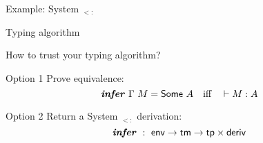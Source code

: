 \begin{frame}{\textcolor{greenish}{Example:} System $_{<:}$}
  \begin{block}{Typing algorithm}
    \begin{overlayarea}\textwidth{8em}
      \large {}




\end{overlayarea}
  \end{block}
\end{frame}

\begin{frame}{How to trust your typing algorithm?}
  \begin{block}{Option 1}
    Prove equivalence:
    $$
    {\text{\textit{\textbf{infer}}}}\ {\Gamma}\ {M}={\text{\textsf{Some}}}\  A
    \quad\text{iff}\quad
    \vdash M : A
    $$
  \end{block}
  \pause
  \begin{block}{Option 2}
    Return a System $_{<:}$ derivation:
    $$
    \fct{infer}\ :\ \cst{env}\to\cst{tm}\to\cst{tp}\times\cst{deriv}
    $$
  \end{block}
\end{frame}

